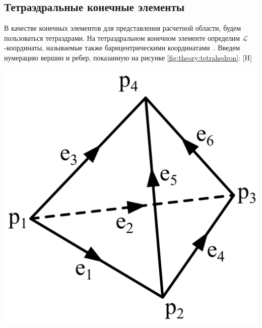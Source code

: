 \documentclass[a4paper,14pt]{article}
\makeatletter
\renewenvironment{figure}[1][\fps@figure]{
  \edef\@tempa{\noexpand\@float{figure}[#1]}
  \@tempa
  \addtocounter{foofigure}{1}
}{
  \end@float
}
\makeatother
\begin{document}

\subsection{Тетраэдральные конечные элементы}

В качестве конечных элементов для представления расчетной области, будем пользоваться тетраэдрами. На тетраэдральном конечном элементе определим $\mathcal{L}$-ко\-ор\-ди\-на\-ты, называемые также барицентрическими координатами~\citep{soloveychick}. Введем нумерацию вершин и ребер, показанную на рисунке \ref{fig:theory:tetrahedron}:
\begin{figure}[H]
	\centering
	\includegraphics[scale=0.25]{theory/tetrahedron.png}
	\caption{тетраэдральный конечный элемент}
	\label{fig:theory:tetrahedron}
\end{figure}
\end{document}
